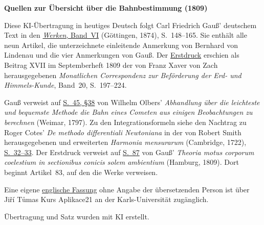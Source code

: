 \clearpage\thispagestyle{empty}
\begin{center}\textbf{Quellen zur Übersicht über die Bahnbestimmung (1809)}\end{center}
\noindent Diese KI-Übertragung in heutiges Deutsch folgt Carl Friedrich Gauß' deutschem Text in den \href{https://gdz.sub.uni-goettingen.de/id/PPN236007467}{\textit{Werken}, Band~VI} (Göttingen, 1874), S.~148--165. Sie enthält alle neun Artikel, die unterzeichnete einleitende Anmerkung von Bernhard von Lindenau und die vier Anmerkungen von Gauß. Der \href{https://www.digitale-sammlungen.de/en/view/bsb10538610?page=203}{Erstdruck} erschien als Beitrag XVII im Septemberheft 1809 der von Franz Xaver von Zach herausgegebenen \textit{Monatlichen Correspondenz zur Beförderung der Erd- und Himmels-Kunde}, Band~20, S.~197--224.
\par\smallskip\noindent Gauß verweist auf \href{https://www.e-rara.ch/zut/content/pageview/449839}{S.~45, §38} von Wilhelm Olbers' \textit{Abhandlung über die leichteste und bequemste Methode die Bahn eines Cometen aus einigen Beobachtungen zu berechnen} (Weimar, 1797). Zu den Integrationsformeln siehe den Nachtrag zu Roger Cotes' \textit{De methodo differentiali Newtoniana} in der von Robert Smith herausgegebenen und erweiterten \textit{Harmonia mensurarum} (Cambridge, 1722), \href{https://www.e-rara.ch/zut/content/pageview/1256011}{S.~32--33}. Der Erstdruck verweist auf \href{https://www.e-rara.ch/zut/content/pageview/142894}{S.~87} von Gauß' \textit{Theoria motus corporum coelestium in sectionibus conicis solem ambientium} (Hamburg, 1809). Dort beginnt Artikel~83, auf den die Werke verweisen.
\par\smallskip\noindent Eine eigene \href{https://www2.karlin.mff.cuni.cz/~tuma/Aplikace21/ALL_Gauss_1809_Summarische.pdf}{englische Fassung} ohne Angabe der übersetzenden Person ist über Jiří Tůmas Kurs Aplikace21 an der Karls-Universität zugänglich.
\par\smallskip\noindent Übertragung und Satz wurden mit KI erstellt.
\clearpage

